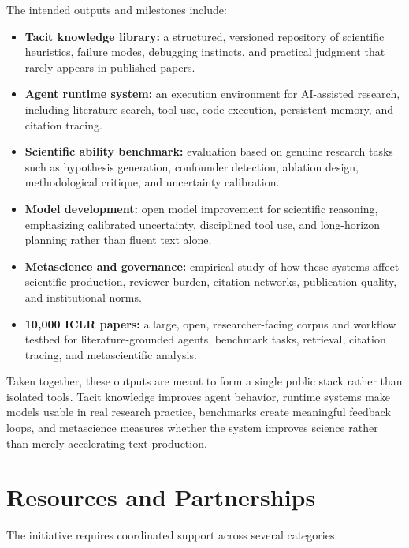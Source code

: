 \documentclass[11pt]{article}
\begin{document}
The intended outputs and milestones include:
\begin{itemize}
    \item \textbf{Tacit knowledge library:} a structured, versioned repository of scientific heuristics, failure modes, debugging instincts, and practical judgment that rarely appears in published papers.
    \item \textbf{Agent runtime system:} an execution environment for AI-assisted research, including literature search, tool use, code execution, persistent memory, and citation tracing.
    \item \textbf{Scientific ability benchmark:} evaluation based on genuine research tasks such as hypothesis generation, confounder detection, ablation design, methodological critique, and uncertainty calibration.
    \item \textbf{Model development:} open model improvement for scientific reasoning, emphasizing calibrated uncertainty, disciplined tool use, and long-horizon planning rather than fluent text alone.
    \item \textbf{Metascience and governance:} empirical study of how these systems affect scientific production, reviewer burden, citation networks, publication quality, and institutional norms.
    \item \textbf{10{,}000 ICLR papers:} a large, open, researcher-facing corpus and workflow testbed for literature-grounded agents, benchmark tasks, retrieval, citation tracing, and metascientific analysis.
\end{itemize}

Taken together, these outputs are meant to form a single public stack rather than isolated tools. Tacit knowledge improves agent behavior, runtime systems make models usable in real research practice, benchmarks create meaningful feedback loops, and metascience measures whether the system improves science rather than merely accelerating text production.

\section{Resources and Partnerships}
The initiative requires coordinated support across several categories:
\end{document}

